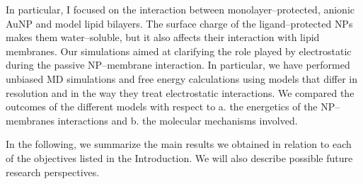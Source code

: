 In particular, I focused on the interaction between monolayer--protected, anionic \ac{AuNP} and model lipid bilayers. The surface charge of the ligand--protected \ac{NP}s makes them water--soluble, but it also affects their interaction with lipid membranes. Our simulations aimed at clarifying the role played by electrostatic during the passive \ac{NP}--membrane interaction. In particular, we have performed unbiased \ac{MD} simulations and free energy calculations using models that differ in resolution and in the way they treat electrostatic interactions. We compared the outcomes of the different models with respect to a. the energetics of the \ac{NP}--membranes interactions and b. the molecular mechanisms involved.

In the following, we summarize the main results we obtained in relation to each of the objectives listed in the Introduction. We will also describe possible future research perspectives.

